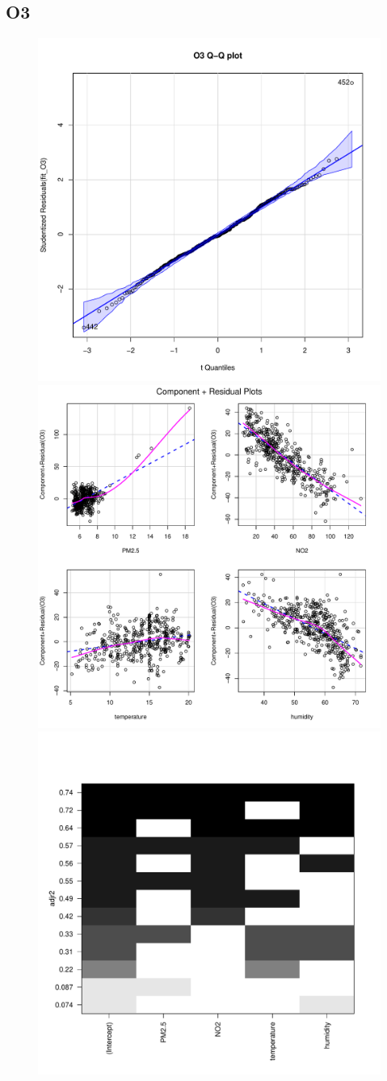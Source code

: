 \documentclass[a4paper,12pt,reqno]{report}
\begin{document}
\subsection{O3}
\begin{figure}[H]
    \centering
    \vspace{-0.35cm}
    \includegraphics[width=0.4\linewidth]{figures/mul_reg_qqPlot_O3.pdf}
    \includegraphics[width=0.4\linewidth]{figures/mul_reg_crPlots_O3.pdf}
    \includegraphics[width=0.4\linewidth]{figures/mul_reg_adjr2_O3.pdf}
\end{figure}



\end{document}

